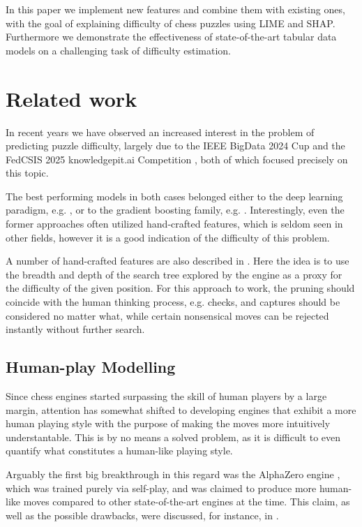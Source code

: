 \documentclass[sigconf,nonacm]{acmart}
\begin{document}
In this paper we implement new features and combine them with existing ones, with the goal of explaining difficulty of chess puzzles using LIME and SHAP. Furthermore we demonstrate the effectiveness of state-of-the-art tabular data models on a challenging task of difficulty estimation. 

\section{Related work}

In recent years we have observed an increased interest in the problem of predicting puzzle difficulty, largely due to the IEEE BigData 2024 Cup \cite{competition2024} and the FedCSIS 2025 knowledgepit.ai Competition \cite{competition2025}, both of which focused precisely on this topic. 

The best performing models in both cases belonged either to the deep learning paradigm, e.g. \cite{compdl, compdl2}, or to the gradient boosting family, e.g. \cite{compgb}. Interestingly, even the former approaches often utilized hand-crafted features, which is seldom seen in other fields, however it is a good indication of the difficulty of this problem.  

A number of hand-crafted features are also described in \cite{bratko2, bratko, bratko3}. Here the idea is to use the breadth and depth of the search tree explored by the engine as a proxy for the difficulty of the given position. For this approach to work, the pruning should coincide with the human thinking process, e.g. checks, and captures should be considered no matter what, while certain nonsensical moves can be rejected instantly without further search. 

\subsection{Human-play Modelling}

Since chess engines started surpassing the skill of human players by a large margin, attention has somewhat shifted to developing engines that exhibit a more human playing style with the purpose of making the moves more intuitively understantable. This is by no means a solved problem, as it is difficult to even quantify what constitutes a human-like playing style. 

Arguably the first big breakthrough in this regard was the AlphaZero engine \cite{alphazero}, which was trained purely via self-play, and was claimed to produce more human-like moves compared to other state-of-the-art engines at the time. This claim, as well as the possible drawbacks, were discussed, for instance, in \cite{bratkoalpha}. 
\end{document}
